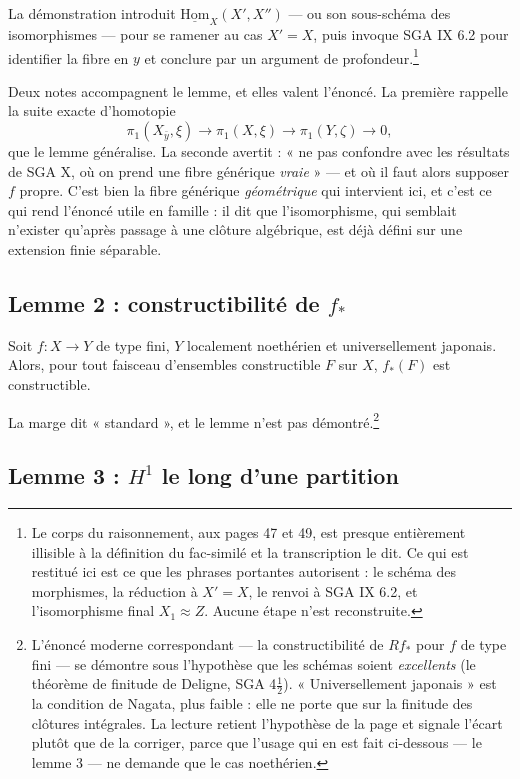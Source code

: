 \documentclass[11pt,a4paper]{article}
\begin{document}
La démonstration introduit $\underline{\mathrm{Hom}}_{X}(X', X'')$ --- ou son
sous-schéma des isomorphismes --- pour se ramener au cas $X' = X$, puis invoque
SGA IX 6.2 pour identifier la fibre en $y$ et conclure par un argument de
profondeur.\footnote{Le corps du raisonnement, aux pages 47 et 49, est presque
entièrement illisible à la définition du fac-similé et la transcription le dit.
Ce qui est restitué ici est ce que les phrases portantes autorisent : le
schéma des morphismes, la réduction à $X' = X$, le renvoi à SGA IX 6.2, et
l'isomorphisme final $X_{1} \approx Z$. Aucune étape n'est reconstruite.}

Deux notes accompagnent le lemme, et elles valent l'énoncé. La première rappelle
la suite exacte d'homotopie
\[
  \pi_{1}(X_{\bar{y}}, \xi) \longrightarrow \pi_{1}(X, \xi) \longrightarrow
  \pi_{1}(Y, \zeta) \longrightarrow 0 ,
\]
que le lemme généralise. La seconde avertit : « ne pas confondre avec les
résultats de SGA X, où on prend une fibre générique \emph{vraie} » --- et où il
faut alors supposer $f$ propre. C'est bien la fibre générique
\emph{géométrique} qui intervient ici, et c'est ce qui rend l'énoncé utile en
famille : il dit que l'isomorphisme, qui semblait n'exister qu'après passage à
une clôture algébrique, est déjà défini sur une extension finie séparable.

\subsection*{Lemme 2 : constructibilité de $f_{*}$}

Soit $f : X \to Y$ de type fini, $Y$ localement noethérien et universellement
japonais. Alors, pour tout faisceau d'ensembles constructible $F$ sur $X$,
$f_{*}(F)$ est constructible.

La marge dit « standard », et le lemme n'est pas démontré.\footnote{L'énoncé
moderne correspondant --- la constructibilité de $R f_{*}$ pour $f$ de type
fini --- se démontre sous l'hypothèse que les schémas soient \emph{excellents}
(le théorème de finitude de Deligne, SGA 4$\frac{1}{2}$). « Universellement
japonais » est la condition de Nagata, plus faible : elle ne porte que sur la
finitude des clôtures intégrales. La lecture retient l'hypothèse de la page et
signale l'écart plutôt que de la corriger, parce que l'usage qui en est fait
ci-dessous --- le lemme 3 --- ne demande que le cas noethérien.}

\subsection*{Lemme 3 : $H^{1}$ le long d'une partition}
\end{document}
